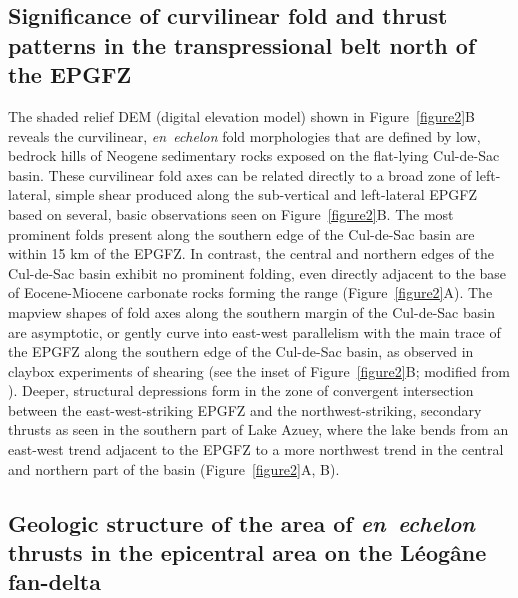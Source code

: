 \documentclass[linenumbers,draft]{agujournal}
\begin{document}
\subsection{Significance of curvilinear fold and thrust patterns in the transpressional belt north of the EPGFZ}
The shaded relief DEM (digital elevation model) shown in Figure~\ref{figure2}B reveals the curvilinear, \textit{en~echelon} fold morphologies that are defined by low, bedrock hills of Neogene sedimentary rocks exposed on the flat-lying Cul-de-Sac basin. These curvilinear fold axes can be related directly to a broad zone of left-lateral, simple shear produced along the sub-vertical and left-lateral EPGFZ based on several, basic observations seen on Figure~\ref{figure2}B. The most prominent folds present along the southern edge of the Cul-de-Sac basin are within 15 km of the EPGFZ. In contrast, the central and northern edges of the Cul-de-Sac basin exhibit no prominent folding, even directly adjacent to the base of Eocene-Miocene carbonate rocks forming the range \citep{pubellier2000plate} (Figure~\ref{figure2}A). The mapview shapes of fold axes along the southern margin of the Cul-de-Sac basin are asymptotic, or gently curve into east-west parallelism with the main trace of the EPGFZ along the southern edge of the Cul-de-Sac basin, as observed in claybox experiments of shearing (see the inset of Figure~{\ref{figure2}}B; modified from \citet{odonne1983analogue}). Deeper, structural depressions form in the zone of convergent intersection between the east-west-striking EPGFZ and the northwest-striking, secondary thrusts as seen in the southern part of Lake Azuey, where the lake bends from an east-west trend adjacent to the EPGFZ to a more northwest trend in the central and northern part of the basin (Figure~\ref{figure2}A, B).

\subsection{Geologic structure of the area of \textit{en~echelon} thrusts in the epicentral area on the L\'eog\^ane fan-delta}
\end{document}
